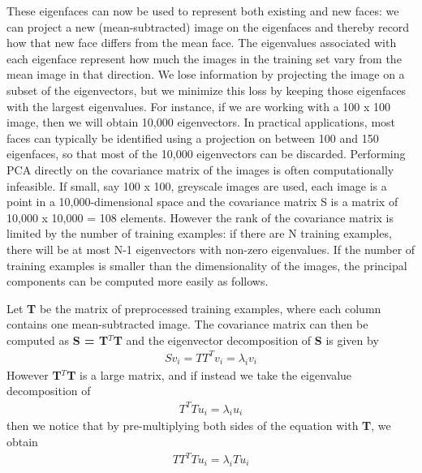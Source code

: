 \documentclass[12pt]{article}			%
\begin{document}
These eigenfaces can now be used to represent both existing and new faces: we can project a new (mean-subtracted) image on the eigenfaces and thereby record how that new face differs from the mean face. The eigenvalues associated with each eigenface represent how much the images in the training set vary from the mean image in that direction. We lose information by projecting the image on a subset of the eigenvectors, but we minimize this loss by keeping those eigenfaces with the largest eigenvalues. For instance, if we are working with a 100 x 100 image, then we will obtain 10,000 eigenvectors. In practical applications, most faces can typically be identified using a projection on between 100 and 150 eigenfaces, so that most of the 10,000 eigenvectors can be discarded.
Performing PCA directly on the covariance matrix of the images is often computationally infeasible. If small, say 100 x 100, greyscale images are used, each image is a point in a 10,000-dimensional space and the covariance matrix S is a matrix of 10,000 x 10,000 = 108 elements. However the rank of the covariance matrix is limited by the number of training examples: if there are N training examples, there will be at most N-1 eigenvectors with non-zero eigenvalues. If the number of training examples is smaller than the dimensionality of the images, the principal components can be computed more easily as follows.

Let {\bf T} be the matrix of preprocessed training examples, where each column contains one mean-subtracted image. The covariance matrix can then be computed as {\bf S = T$^{T}$T} and the eigenvector decomposition of {\bf S} is given by\\
\begin{align*}
Sv_{i} = TT^{T}v_{i} = \lambda_{i}v_{i}
\end{align*}
However {\bf T$^{T}$T } is a large matrix, and if instead we take the eigenvalue decomposition of
\begin{align*}
T^{T}Tu_{i} = \lambda_{i}u_{i}
\end{align*}
then we notice that by pre-multiplying both sides of the equation with {\bf T}, we obtain
\begin{align*}
TT^{T}Tu_{i} = \lambda_{i}Tu_{i}
\end{align*}
\end{document}
